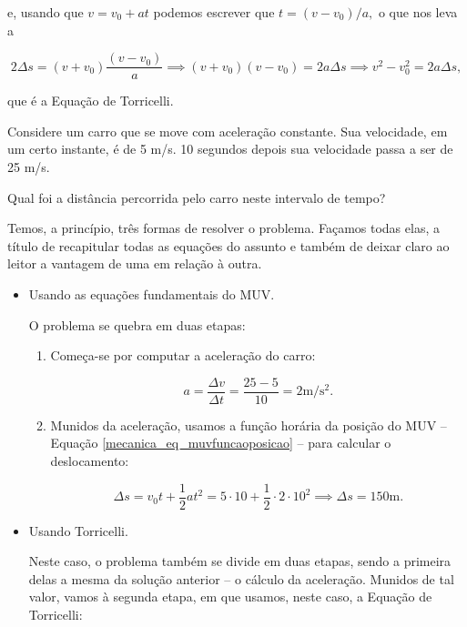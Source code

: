\noindent e, usando que $v=v_0+at$ podemos escrever que $t=(v-v_0)/a,$ o que nos leva a

$$2 \Delta s = (v + v_0) \dfrac{(v-v_0)}{a} \implies (v+v_0)(v-v_0) = 2a\Delta s \implies v^2 - v_0^2 = 2a \Delta s,$$

\noindent que é a Equação de Torricelli.






\vspace{0.3cm}


\begin{exemplo}[Nível I]\label{exemplo_cinematica_muvvelocidademedia01}


Considere um carro que se move com aceleração constante. Sua velocidade, em um certo instante, é de 5 m/s. 10 segundos depois sua velocidade passa a ser de 25 m/s. 

Qual foi a distância percorrida pelo carro neste intervalo de tempo?

\resolucao

Temos, a princípio, três formas de resolver o problema. Façamos todas elas, a título de recapitular todas as equações do assunto e também de deixar claro ao leitor a vantagem de uma em relação à outra.

\begin{itemize}
    \item [(i)] Usando as equações fundamentais do MUV.

    O problema se quebra em duas etapas:

    \begin{enumerate}
        \item Começa-se por computar a aceleração do carro:

        $$ a = \dfrac{\Delta v}{\Delta t}=\dfrac{25-5}{10}=2 \text{m/s$^2$.}$$

        \item Munidos da aceleração, usamos a função horária da posição do MUV -- Equação \eqref{mecanica_eq_muvfuncaoposicao} -- para calcular o deslocamento:

        $$ \Delta s = v_0t + \dfrac{1}{2}at^2 = 5\cdot 10+\dfrac{1}{2}\cdot 2 \cdot 10^2 \implies \boxed{\Delta s =150 \text{m} .}$$
    \end{enumerate}

    \item [(ii)] Usando Torricelli.

    Neste caso, o problema também se divide em duas etapas, sendo a primeira delas a mesma da solução anterior -- o cálculo da aceleração. Munidos de tal valor, vamos à segunda etapa, em que usamos, neste caso, a Equação de Torricelli:


\end{itemize}
\end{exemplo}
